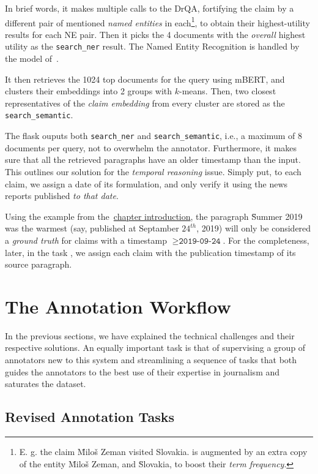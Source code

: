 In brief words, it makes multiple calls to the \textsf{DrQA}, fortifying the claim by a different pair of mentioned \textit{named entities} in each\footnote{E. g. the claim \"{Miloš Zeman visited Slovakia.} is augmented by an extra copy of the entity \"{Miloš Zeman}, and \"{Slovakia}, to boost their \textit{term frequency}.}, to obtain their highest-utility results for each NE pair. Then it picks the 4 documents with the \textit{overall} highest utility as the \texttt{search\_ner} result. The Named Entity Recognition is handled by the model of~\cite{strakova-etal-2019-neural}.

It then retrieves the 1024 top documents for the query using \textsf{mBERT}, and clusters their embeddings into 2 groups with $k$-means. Then, two closest representatives of the \textit{claim embedding} from every cluster are stored as the \texttt{search\_semantic}.

The flask ouputs both \texttt{search\_ner} and \texttt{search\_semantic}, i.e., a maximum of 8 documents per query, not to overwhelm the annotator. Furthermore, it makes sure that all the retrieved paragraphs have an older timestamp than the input. This outlines our solution for the \textit{temporal reasoning} issue. Simply put, to each claim, we assign a date of its formulation, and only verify it using the news reports published \textit{to that date}.

Using the example from the~\hyperref[chap:ctk]{chapter introduction}, the paragraph \"{Summer 2019 was the warmest} (say, published at Septamber $24^{th}$, 2019) will only be considered a \textit{ground truth} for claims with a timestamp $\geq \texttt{2019-09-24}$. For the completeness, later, in the task \tjednab{}, we assign each claim with the publication timestamp of its source paragraph.

\section{The Annotation Workflow}
In the previous sections, we have explained the technical challenges and their respective solutions. An equally important task is that of supervising a group of annotators new to this system and streamlining a sequence of tasks that both guides the annotators to the best use of their expertise in journalism and saturates the dataset.



\subsection{Revised Annotation Tasks}


